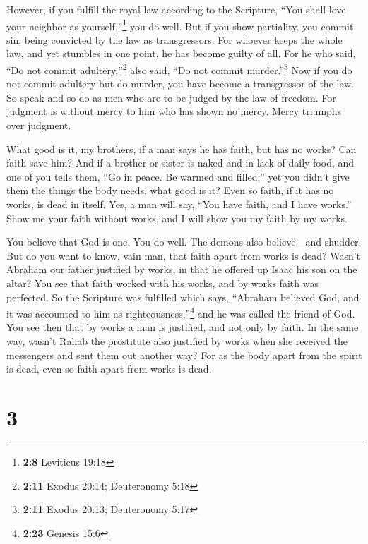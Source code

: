  However, if you fulfill the royal law according to the
Scripture, ``You shall love your neighbor as yourself,''\footnote{\textbf{2:8}
  Leviticus 19:18} you do well.  But if you show
partiality, you commit sin, being convicted by the law as transgressors.
 For whoever keeps the whole law, and yet stumbles in one
point, he has become guilty of all.  For he who said,
``Do not commit adultery,''\footnote{\textbf{2:11} Exodus 20:14;
  Deuteronomy 5:18} also said, ``Do not commit murder.''\footnote{\textbf{2:11}
  Exodus 20:13; Deuteronomy 5:17} Now if you do not commit adultery but
do murder, you have become a transgressor of the law.  So
speak and so do as men who are to be judged by the law of freedom.
 For judgment is without mercy to him who has shown no
mercy. Mercy triumphs over judgment.

 What good is it, my brothers, if a man says he has
faith, but has no works? Can faith save him?  And if a
brother or sister is naked and in lack of daily food, 
and one of you tells them, ``Go in peace. Be warmed and filled;'' yet
you didn't give them the things the body needs, what good is it?
 Even so faith, if it has no works, is dead in itself.
 Yes, a man will say, ``You have faith, and I have
works.'' Show me your faith without works, and I will show you my faith
by my works.

 You believe that God is one. You do well. The demons
also believe---and shudder.  But do you want to know,
vain man, that faith apart from works is dead?  Wasn't
Abraham our father justified by works, in that he offered up Isaac his
son on the altar?  You see that faith worked with his
works, and by works faith was perfected.  So the
Scripture was fulfilled which says, ``Abraham believed God, and it was
accounted to him as righteousness,''\footnote{\textbf{2:23} Genesis 15:6}
and he was called the friend of God.  You see then that
by works a man is justified, and not only by faith.  In
the same way, wasn't Rahab the prostitute also justified by works when
she received the messengers and sent them out another way?
 For as the body apart from the spirit is dead, even so
faith apart from works is dead.

\hypertarget{section-2}{%
\section{3}\label{section-2}}

